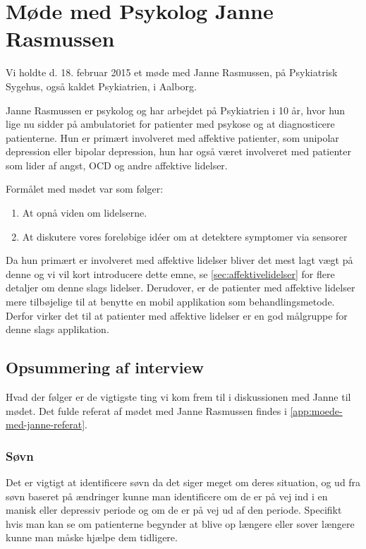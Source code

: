 \section{Møde med Psykolog Janne Rasmussen}\label{sec:moede-med-psykolog}
Vi holdte d. 18. februar 2015 et møde med Janne Rasmussen, på Psykiatrisk Sygehus, også kaldet Psykiatrien, i Aalborg.

Janne Rasmussen er psykolog og har arbejdet på Psykiatrien i 10 år, hvor hun lige nu sidder på ambulatoriet for patienter med psykose og  at diagnosticere patienterne. 
Hun er primært involveret med affektive patienter, som unipolar depression eller bipolar depression, hun har også været involveret med patienter som lider af angst, OCD og andre affektive lidelser.

Formålet med mødet var som følger:

\begin{enumerate}
\item At opnå viden om lidelserne.
\item At diskutere vores foreløbige idéer om at detektere symptomer via sensorer
\end{enumerate}

Da hun primært er involveret med affektive lidelser bliver det mest lagt vægt på denne og vi vil kort introducere dette emne, se \cref{sec:affektivelidelser} for flere detaljer om denne slags lidelser.
Derudover, er de patienter med affektive lidelser mere tilbøjelige til at benytte en mobil applikation som behandlingsmetode.
Derfor virker det til at patienter med affektive lidelser er en god målgruppe for denne slags applikation.

\subsection{Opsummering af interview}
Hvad der følger er de vigtigste ting vi kom frem til i diskussionen med Janne til mødet.
Det fulde referat af mødet med Janne Rasmussen findes i \cref{app:moede-med-janne-referat}.

\subsubsection{Søvn}
Det er vigtigt at identificere søvn da det siger meget om deres situation, og ud fra søvn baseret på ændringer kunne man identificere om de er på vej ind i en manisk eller depressiv periode og om de er på vej ud af den periode. 
Specifikt hvis man kan se om patienterne begynder at blive op længere eller sover længere kunne man måske hjælpe dem tidligere.

